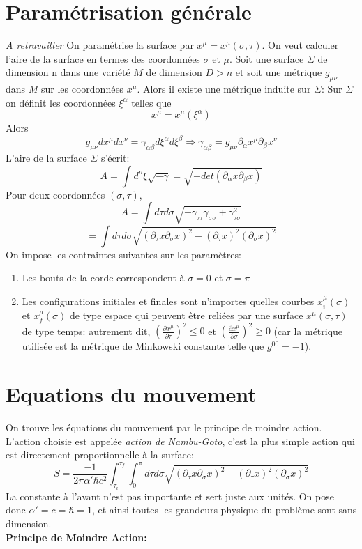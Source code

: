 \documentclass[a4paper,12pt]{article}
\def\xmu{x^\mu}
\begin{document}
\section{Paramétrisation générale}
\textit{A retravailler}
On paramétrise la surface par $x^{\mu}=x^{\mu}(\sigma,\tau)$. On veut calculer l'aire de la surface en termes des coordonnées $\sigma$ et $\mu$.
Soit une surface $\Sigma$ de dimension n dans une variété $M$ de dimension $D>n$ et soit une métrique $g_{\mu\nu}$ dans $M$ sur les coordonnées $\xmu$. Alors il existe une métrique induite sur $\Sigma$:
Sur $\Sigma$ on définit les coordonnées $\xi^\alpha$ telles que 
$$\xmu=\xmu(\xi^\alpha) $$
Alors $$g_{\mu\nu}d\xmu dx^\nu=\gamma_{\alpha\beta}d\xi^\alpha d\xi^\beta \Rightarrow \gamma_{\alpha\beta}=g_{\mu\nu}\partial_\alpha\xmu\partial_\beta x^\nu$$
L'aire de la surface $\Sigma$ s'écrit: $$A=\int d^n\xi\sqrt{-\gamma}=\sqrt{-det(\partial_\alpha x\partial_\beta x)}$$
Pour deux coordonnées $(\sigma,\tau)$, $$A=\int d\tau d\sigma \sqrt{-\gamma_{\tau\tau}\gamma_{\sigma\sigma}+\gamma^2_{\tau\sigma}}$$
$$=\int d\tau d\sigma \sqrt{(\partial_\tau x \partial_\sigma x)^2-(\partial_\tau x)^2(\partial_\sigma x)^2}$$
On impose les contraintes suivantes sur les paramètres:
\begin{enumerate}
\item Les bouts de la corde correspondent à $\sigma=0$ et $\sigma=\pi$
\item Les configurations initiales et finales sont n'importes quelles courbes $x^{\mu}_{i}(\sigma)$ et $x^{\mu}_{f}(\sigma)$  de type espace qui peuvent être reliées par une surface $x^{\mu}(\sigma,\tau)$ de type temps:
autrement dit, $\left( \frac{\partial x^{\mu}}{\partial \tau}\right)^{2}\leq 0 $ et $\left( \frac{\partial x^{\mu}}{\partial \sigma}\right)^{2}\geq 0 $ (car la métrique utilisée est la métrique de Minkowski constante telle que $g^{00}=-1$).
\end{enumerate}
\section{Equations du mouvement}
On trouve les équations du mouvement par le principe de moindre action. L'action choisie est appelée \textit{action de Nambu-Goto}, c'est la plus simple action qui est directement proportionnelle à la surface:
\begin{equation}
S=\frac{-1}{2\pi \alpha'\hbar c^{2}}\int_{\tau_{i}}^{\tau_{f}}\int_{0}^{\pi}d\tau d\sigma \sqrt{(\partial_\tau x \partial_\sigma x)^2-(\partial_\tau x)^2(\partial_\sigma x)^2}
\end{equation} 
La constante à l'avant n'est pas importante et sert juste aux unités. On pose donc $\alpha '=c=\hbar =1$, et ainsi toutes les grandeurs physique du problème sont sans dimension.\\
\textbf{Principe de Moindre Action:} 
\end{document}
